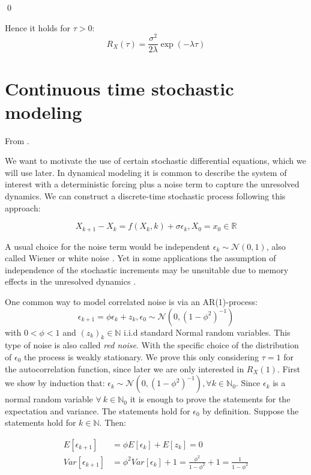 \documentclass[%
thesis=student,%
coverpage=false,%
titlepage=false,%
headmarks=true, %
english,%
font=libertine, %
math=newpxtx, %
BCOR=5mm,%
coverBCOR=11mm%
]{tumbook}
\begin{document}
\qed

Hence it holds for $\tau > 0$:
\[
R_{X}(\tau) =  \frac{\sigma^2}{2\lambda}\exp(-\lambda\tau)
\]


\section{Continuous time stochastic modeling}
\label{Continuous time stochastic modeling}
From \cite{Morr:2022}.

We want to motivate the use of certain stochastic differential equations, which we will use later. 
In dynamical modeling it is common to describe the system of interest with a deterministic forcing plus a noise term to capture the unresolved dynamics. We can construct a discrete-time stochastic process following this approach:

\begin{equation}
    X_{k+1}-X_{k} = f(X_{k},k) + \sigma\epsilon_{k}, X_{0} = x_{0} \in \mathbb{R}
    \label{eq:discrete-time modelling}
\end{equation}

A usual choice for the noise term would be independent $\epsilon_{k} \sim \mathcal{N}(0,1)$, also called Wiener or white noise \cite{zwanzig:2001}.
Yet in some applications the assumption of independence of the stochastic increments may be unsuitable due to memory effects in the unresolved dynamics \cite{zwanzig:1961,chorin:2000}.

One common way to model correlated noise is via an AR(1)-process:
\[
\epsilon_{k+1} = \phi\epsilon_{k} + z_{k}, \epsilon_{0} \sim \mathcal{N}(0,(1-\phi^2)^{-1})
\]
with $0<\phi<1$ and $(z_{k})_{k}\in\mathbb{N}$ i.i.d standard Normal random variables. This type of noise is also called \textit{red noise}. With the specific choice of the distribution of $\epsilon_{0}$ the process is weakly stationary. We prove this only considering $\tau = 1$ for the autocorrelation function, since later we are only interested in $R_{X}(1)$. First we show by induction that: $\epsilon_{k} \sim \mathcal{N}(0,(1-\phi^2)^{-1}), \forall k \in \mathbb{N}_{0}$. Since $\epsilon_{k}$ is a normal random variable $\forall \ k \in \mathbb{N}_{0}$ it is enough to prove the statements for the expectation and variance. The statements hold for $\epsilon_{0}$ by definition. Suppose the statements hold for $k \in \mathbb{N}$. Then:

\begin{subequations}
    \begin{align}
        E[\epsilon_{k+1}] &= \phi E[\epsilon_{k}] + E[z_{k}]  = 0 \\
        Var[\epsilon_{k+1}] &= \phi^2 Var[\epsilon_{k}] + 1 = \frac{\phi^2}{1-\phi^2} + 1 = \frac{1}{1-\phi^2}     
    \end{align}
\end{subequations}   
\end{document}
